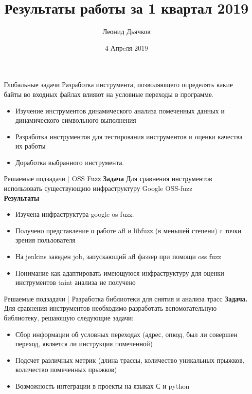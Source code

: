 \documentclass[10pt]{beamer}
\title{Результаты работы за 1 квартал 2019}
\author{Леонид Дьячков}
\institute{ИСП РАН}
\date{4 Апрeля 2019}
\begin{document}
\maketitle

\begin{frame}{Глобальные задачи}
    Разработка инструмента, позволяющего определять какие байты во входных файлах влияют на условные переходы в программе. 
    \begin{itemize}
      \item Изучение инструментов динамического анализа помеченных данных и динамического символьного выполнения
      \item Разработка инструментов для тестирования инструментов и оценки качества их работы
      \item Доработка выбранного инструмента.
    \end{itemize}
\end{frame}

\begin{frame}{Решаемые подзадачи | OSS Fuzz}
    \textbf{Задача} Для сравнения инструментов использовать существующию инфраструктуру Google OSS-fuzz \\
    \textbf{Результаты}
    \begin{itemize}
      \item Изучена инфраструктура google os fuzz.
      \item Получено представление о работе afl и libfuzz (в меньшей степени) c точки зрения пользователя
      \item На jenkins заведен job, запускающий afl фаззер при помощи oss fuzz
      \item Понимание как адаптировать имеющуюся инфраструктуру для оценки инструментов taint анализа не получено
    \end{itemize}
\end{frame}

\begin{frame}{Решаемые подзадачи | Разработка библиотеки для снятия и анализа трасс}
    \textbf{Задача.} Для сравнения инструментов необходимо разработать вспомогательную библиотеку, решающую следующие задачи:
    \begin{itemize}
      \item Сбор информации об условных переходах (адрес, опкод, был ли совершен переход, является ли инструкция помеченной)
      \item Подсчет различных метрик (длина трассы, количество уникальных прыжков, количество помеченных прыжков)
      \item Возможность интеграции в проекты на языках С и python
    \end{itemize}
  \end{frame}
\end{document}
